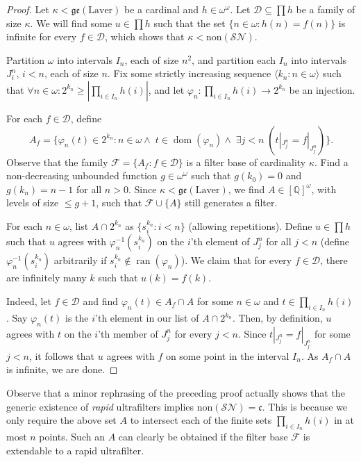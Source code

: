 \documentclass[12pt]{article}
\theoremstyle{definition}
\newcommand\ran{\operatorname{ran}}
\newcommand\dom{\operatorname{dom}}
\begin{document}
\begin{proof}
Let $\kappa<\mathfrak{ge}(\text{Laver})$ be a cardinal and $h\in\omega^\omega$. Let $\mathcal{D}\subseteq \prod h$ be a family of size $\kappa$. We will find some $u\in\prod h$ such that the set $\{n\in \omega: h(n)=f(n)\}$ is infinite for every $f\in \mathcal{D}$, which shows that $\kappa < \text{non}(\mathcal{SN})$.

Partition $\omega$ into intervals $I_n$, each of size $n^2$, and partition each $I_n$ into intervals $J^n_i$, $i<n$, each of size $n$. Fix some strictly increasing sequence $\langle k_n: n \in \omega \rangle$ such that $\forall n \in \omega: 2^{k_n}\geq |\prod_{i\in I_n} h(i)|$, and let $\varphi_n : \prod_{i\in I_n} h(i) \to 2^{k_n}$ be an injection.

For each $f\in \mathcal{D}$, define
\[A_f=\{\varphi_n(t) \in 2^{k_n} : n\in\omega \land \; t\in\dom(\varphi_n) \land \; \exists j<n \; (t|_{J^n_j}=f|_{J^n_j})\}.\]
Observe that the family $\mathcal{F}=\{A_f : f\in \mathcal{D}\}$ is a filter base of cardinality $\kappa$. Find a non-decreasing unbounded function $g\in\omega^\omega$ such that $g(k_0)=0$ and $g(k_n)=n-1$ for all $n>0$. Since $\kappa<\mathfrak{ge}(\text{Laver})$, we find $A\in [\mathbb{Q}]^\omega$, with levels of size $\leq g+1$, such that $\mathcal{F}\cup\{A\}$ still generates a filter.

For each $n\in\omega$, list $A\cap 2^{k_n}$ as $\{s^{k_n}_i: i < n\}$ (allowing repetitions). Define $u \in\prod h$ such that $u$ agrees with $\varphi^{-1}_n(s^{k_n}_i)$ on the $i$'th element of $J^n_j$ for all $j<n$ (define $\varphi^{-1}_n(s^{k_n}_i)$ arbitrarily if $s^{k_n}_i\notin \ran(\varphi_n)$). We claim that for every $f\in\mathcal{D}$, there are infinitely many $k$ such that $u(k)=f(k)$.

Indeed, let $f\in\mathcal{D}$ and find $\varphi_n(t)\in A_f\cap A$ for some $n\in\omega$ and $t\in\prod_{i\in I_n} h(i)$. Say $\varphi_n(t)$ is the $i$'th element in our list of $A\cap 2^{k_n}$. Then, by definition, $u$ agrees with $t$ on the $i$'th member of $J^n_j$ for every $j<n$. Since $t|_{J^n_j}=f|_{J^n_j}$ for some $j<n$, it follows that $u$ agrees with $f$ on some point in the interval $I_n$. As $A_f\cap A$ is infinite, we are done.
\end{proof}

Observe that a minor rephrasing of the preceding proof actually shows that the generic existence of \emph{rapid} ultrafilters implies $\text{non}(\mathcal{SN})=\mathfrak{c}$. This is because we only require the above set $A$ to intersect each of the finite sets $\prod_{i \in I_n}h(i)$ in at most $n$ points. Such an $A$ can clearly be obtained if the filter base $\mathcal{F}$ is extendable to a rapid ultrafilter.
\end{document}
